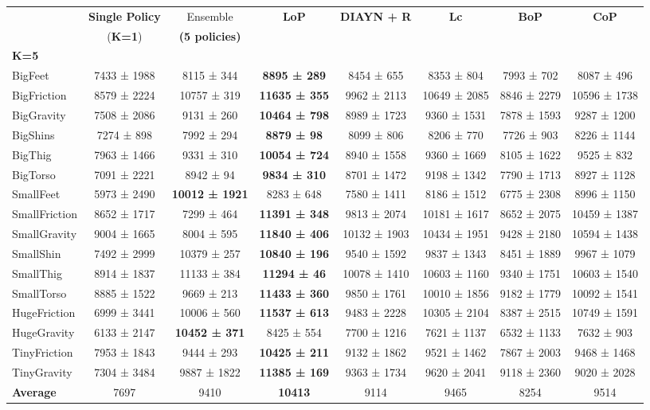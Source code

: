 \scriptsize{}
\begin{tabular}{l|c|c|c|c|c|c|c}
 &\textbf{Single Policy} & Ensemble &\textbf{LoP} &\textbf{DIAYN + R} &\textbf{Lc} &\textbf{BoP} &\textbf{CoP} \\ 
 & (\textbf{K=1}) & \textbf{(5 policies)} & & & & &\\ \midrule
 \textbf{K=5}& & & & & & \\
BigFeet &7433 ± 1988 & 8115 ± 344 &\textbf{8895 ± 289} &8454 ± 655 &8353 ± 804 &7993 ± 702 &8087 ± 496 \\
BigFriction &8579 ± 2224 & 10757 ± 319 & \textbf{11635 ± 355} &9962 ± 2113 &10649 ± 2085 &8846 ± 2279 &10596 ± 1738 \\
BigGravity &7508 ± 2086 & 9131 ± 260 & \textbf{10464 ± 798} &8989 ± 1723 &9360 ± 1531 &7878 ± 1593 &9287 ± 1200 \\
BigShins &7274 ± 898 & 7992 ± 294 &\textbf{8879 ± 98} &8099 ± 806 &8206 ± 770 &7726 ± 903 &8226 ± 1144 \\
BigThig &7963 ± 1466 & 9331 ± 310 & \textbf{10054 ± 724} &8940 ± 1558 &9360 ± 1669 &8105 ± 1622 &9525 ± 832 \\
BigTorso &7091 ± 2221 & 8942 ± 94 & \textbf{9834 ± 310} &8701 ± 1472 &9198 ± 1342 &7790 ± 1713 &8927 ± 1128 \\
SmallFeet &5973 ± 2490 & \textbf{10012 ± 1921} & 8283 ± 648 &7580 ± 1411 &8186 ± 1512 &6775 ± 2308 &8996 ± 1150 \\
SmallFriction &8652 ± 1717 & 7299 ± 464 & \textbf{11391 ± 348} &9813 ± 2074 &10181 ± 1617 &8652 ± 2075 &10459 ± 1387 \\
SmallGravity &9004 ± 1665 & 8004 ± 595 & \textbf{11840 ± 406} &10132 ± 1903 &10434 ± 1951 &9428 ± 2180 &10594 ± 1438 \\
SmallShin &7492 ± 2999 & 10379 ± 257 & \textbf{10840 ± 196} &9540 ± 1592 &9837 ± 1343 &8451 ± 1889 &9967 ± 1079 \\
SmallThig &8914 ± 1837 & 11133 ± 384 & \textbf{11294 ± 46} &10078 ± 1410 &10603 ± 1160 &9340 ± 1751 &10603 ± 1540 \\
SmallTorso &8885 ± 1522 & 9669 ± 213 & \textbf{11433 ± 360} &9850 ± 1761 &10010 ± 1856 &9182 ± 1779 &10092 ± 1541 \\
HugeFriction &6999 ± 3441 & 10006 ± 560 & \textbf{11537 ± 613} &9483 ± 2228 &10305 ± 2104 &8387 ± 2515 &10749 ± 1591 \\
HugeGravity &6133 ± 2147 & \textbf{10452 ± 371} & 8425 ± 554 &7700 ± 1216 &7621 ± 1137 &6532 ± 1133 &7632 ± 903 \\
TinyFriction &7953 ± 1843 & 9444 ± 293 & \textbf{10425 ± 211} &9132 ± 1862 &9521 ± 1462 &7867 ± 2003 &9468 ± 1468 \\
TinyGravity &7304 ± 3484 & 9887 ± 1822 & \textbf{11385 ± 169} &9363 ± 1734 &9620 ± 2041 &9118 ± 2360 &9020 ± 2028 \\\bottomrule
\textbf{Average} &7697 & 9410 & \textbf{10413} &9114 &9465 &8254 &9514 \\\bottomrule
\end{tabular}
\vspace{0.5cm}



